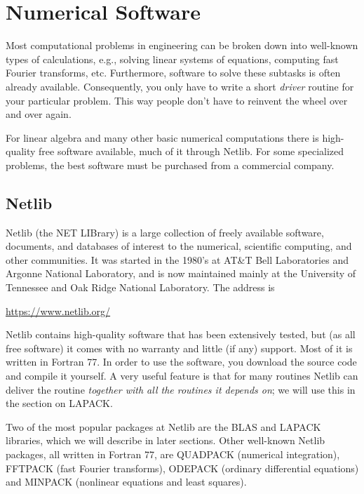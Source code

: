 \chapter{Numerical Software}

Most computational problems in engineering can be broken down into well-known types of calculations, e.g., solving linear systems of equations, computing fast Fourier transforms, etc. Furthermore, software to solve these subtasks is often already available. Consequently, you only have to write a short \emph{driver} routine for your particular problem. This way people don't have to reinvent the wheel over and over again.

For linear algebra and many other basic numerical computations there is high-quality free software available, much of it through Netlib. For some specialized problems, the best software must be purchased from a commercial company.

\section{Netlib}

Netlib (the NET LIBrary) is a large collection of freely available software, documents, and databases of interest to the numerical, scientific computing, and other communities. It was started in the 1980's at AT\&T Bell Laboratories and Argonne National Laboratory, and is now maintained mainly at the University of Tennessee and Oak Ridge National Laboratory. The address is

\begin{center}
\url{https://www.netlib.org/}
\end{center}

Netlib contains high-quality software that has been extensively tested, but (as all free software) it comes with no warranty and little (if any) support. Most of it is written in Fortran 77. In order to use the software, you download the source code and compile it yourself. A very useful feature is that for many routines Netlib can deliver the routine \emph{together with all the routines it depends on}; we will use this in the section on LAPACK.

Two of the most popular packages at Netlib are the BLAS and LAPACK libraries, which we will describe in later sections. Other well-known Netlib packages, all written in Fortran 77, are QUADPACK (numerical integration), FFTPACK (fast Fourier transforms), ODEPACK (ordinary differential equations) and MINPACK (nonlinear equations and least squares).

